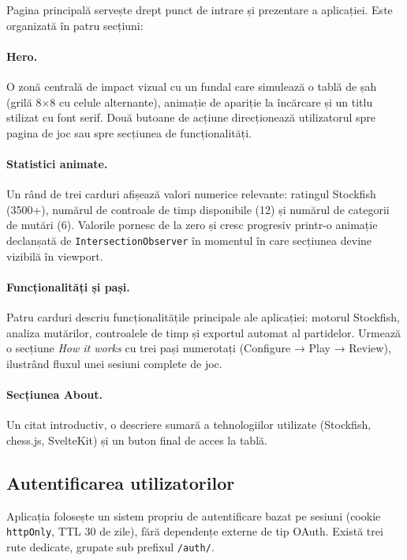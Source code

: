 \documentclass[12pt,a4paper]{article}
\begin{document}
Pagina principală servește drept punct de intrare și prezentare a aplicației. Este organizată în patru secțiuni:

\paragraph{Hero.}
O zonă centrală de impact vizual cu un fundal care simulează o tablă de șah (grilă 8×8 cu celule alternante), animație de apariție la încărcare și un titlu stilizat cu font serif. Două butoane de acțiune direcționează utilizatorul spre pagina de joc sau spre secțiunea de funcționalități.

\paragraph{Statistici animate.}
Un rând de trei carduri afișează valori numerice relevante: ratingul Stockfish (3500+), numărul de controale de timp disponibile (12) și numărul de categorii de mutări (6). Valorile pornesc de la zero și cresc progresiv printr-o animație declanșată de \texttt{IntersectionObserver} în momentul în care secțiunea devine vizibilă în viewport.

\paragraph{Funcționalități și pași.}
Patru carduri descriu funcționalitățile principale ale aplicației: motorul Stockfish, analiza mutărilor, controalele de timp și exportul automat al partidelor. Urmează o secțiune \textit{How it works} cu trei pași numerotați (Configure → Play → Review), ilustrând fluxul unei sesiuni complete de joc.

\paragraph{Secțiunea About.}
Un citat introductiv, o descriere sumară a tehnologiilor utilizate (Stockfish, chess.js, SvelteKit) și un buton final de acces la tablă.

\subsection{Autentificarea utilizatorilor}

Aplicația folosește un sistem propriu de autentificare bazat pe sesiuni (cookie \texttt{httpOnly}, TTL 30 de zile), fără dependențe externe de tip OAuth. Există trei rute dedicate, grupate sub prefixul \texttt{/auth/}.
\end{document}
